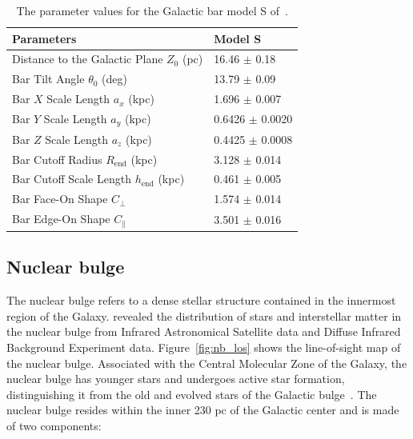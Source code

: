 \documentclass[doublespace,nopageskip]{VTthesis}
\begin{document}
\begin{table}[htb]
\centering
\caption{ The parameter values for the Galactic bar model S of~\citet{1998ApJ...492..495F}.}
    \begin{tabular}{ll}
    \toprule
      Parameters & Model S \\ 
      \midrule
      Distance to the Galactic Plane $Z_0$ (pc) & 16.46 $\pm$ 0.18\\
      Bar Tilt Angle $\theta_0$ (deg) & 13.79 $\pm$ 0.09\\
      Bar $X$ Scale Length $a_x$ (kpc) & 1.696 $\pm$ 0.007 \\
      Bar $Y$ Scale Length $a_y$ (kpc) & 0.6426 $\pm$ 0.0020 \\
      Bar $Z$ Scale Length $a_z$ (kpc) & 0.4425 $\pm$ 0.0008 \\
      Bar Cutoff Radius $R_{\text{end}}$ (kpc) & 3.128 $\pm$ 0.014 \\
      Bar Cutoff Scale Length $h_{\text{end}}$ (kpc) & 0.461 $\pm$ 0.005 \\
      Bar Face-On Shape $C_\perp$ & 1.574 $\pm$ 0.014 \\
      Bar Edge-On Shape $C_\parallel$ & 3.501 $\pm$ 0.016\\
      \bottomrule
    \end{tabular}
\label{tab:modelS}
\end{table}

\subsection{Nuclear bulge}\label{sec:nb}

The nuclear bulge refers to a dense stellar structure contained in the innermost region of the Galaxy. \citet{2002A&A...384..112L} revealed the distribution of stars and interstellar matter in the nuclear bulge from Infrared Astronomical Satellite data and Diffuse Infrared Background Experiment data. Figure~\ref{fig:nb_los} shows the line-of-sight map of the nuclear bulge. Associated with the Central Molecular Zone of the Galaxy, the nuclear bulge has younger stars and undergoes active star formation, distinguishing it from the old and evolved stars of the Galactic bulge~\cite{2002A&A...384..112L}. 
The nuclear bulge resides within the inner 230 pc of the Galactic center and is made of two components:
\end{document}
